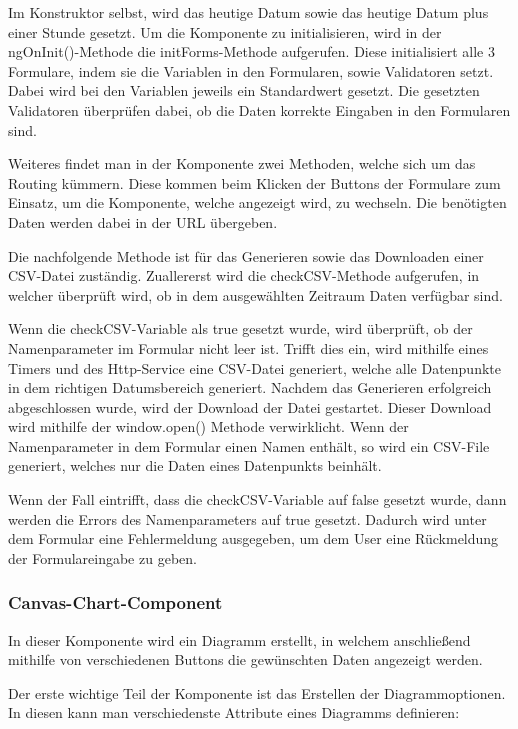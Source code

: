 Im Konstruktor selbst, wird das heutige Datum sowie das heutige Datum plus einer Stunde gesetzt.
Um die Komponente zu initialisieren, wird in der ngOnInit()-Methode die initForms-Methode aufgerufen. Diese initialisiert alle 3 Formulare, indem sie die Variablen in den Formularen, sowie Validatoren setzt. Dabei wird bei den Variablen jeweils ein Standardwert gesetzt. Die gesetzten Validatoren überprüfen dabei, ob die Daten korrekte Eingaben in den Formularen sind. 

Weiteres findet man in der Komponente zwei Methoden, welche sich um das Routing kümmern. Diese kommen beim Klicken der Buttons der Formulare zum Einsatz, um die Komponente, welche angezeigt wird, zu wechseln. Die benötigten Daten werden dabei in der URL übergeben.

Die nachfolgende Methode ist für das Generieren sowie das Downloaden einer CSV-Datei zuständig. Zuallererst wird die checkCSV-Methode aufgerufen, in welcher überprüft wird, ob in dem ausgewählten Zeitraum Daten verfügbar sind.

Wenn die checkCSV-Variable als true gesetzt wurde, wird überprüft, ob der Namenparameter im Formular nicht leer ist. Trifft dies ein, wird mithilfe eines Timers und des Http-Service eine CSV-Datei generiert, welche alle Datenpunkte in dem richtigen Datumsbereich generiert. Nachdem das Generieren erfolgreich abgeschlossen wurde, wird der Download der Datei gestartet. Dieser Download wird mithilfe der window.open() Methode verwirklicht. Wenn der Namenparameter in dem Formular einen Namen enthält, so wird ein CSV-File generiert, welches nur die Daten eines Datenpunkts beinhält.

Wenn der Fall eintrifft, dass die checkCSV-Variable auf false gesetzt wurde, dann werden die Errors des Namenparameters auf true gesetzt. Dadurch wird unter dem Formular eine Fehlermeldung ausgegeben, um dem User eine Rückmeldung der Formulareingabe zu geben.

\subsubsection{Canvas-Chart-Component}

In dieser Komponente wird ein Diagramm erstellt, in welchem anschließend mithilfe von verschiedenen Buttons die gewünschten Daten angezeigt werden.  

Der erste wichtige Teil der Komponente ist das Erstellen der Diagrammoptionen. In diesen kann man verschiedenste Attribute eines Diagramms definieren: 

